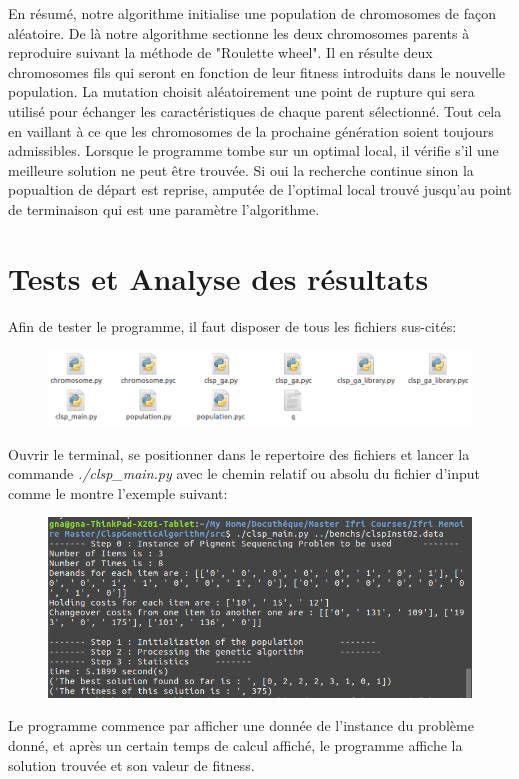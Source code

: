 \documentclass[11pt,a4paper]{article}
\begin{document}
	En résumé, notre algorithme initialise une population de chromosomes de façon aléatoire. De là notre algorithme sectionne les deux chromosomes parents à reproduire suivant la méthode de "Roulette wheel". Il en résulte deux chromosomes fils qui seront en fonction de leur fitness introduits dans le nouvelle population. La mutation choisit aléatoirement une point de rupture qui sera utilisé pour échanger les caractéristiques de chaque parent sélectionné. Tout cela en vaillant à ce que les chromosomes de la prochaine génération soient toujours admissibles. Lorsque le programme tombe sur un optimal local, il vérifie s'il une meilleure solution ne peut être trouvée. Si oui la recherche continue sinon la popualtion de départ est reprise, amputée de l'optimal local trouvé jusqu'au point de terminaison qui est une paramètre l'algorithme.  
	
\section{Tests et Analyse des résultats}
	Afin de tester le programme, il faut disposer de tous les fichiers sus-cités:
	\begin{center}
		\begin{figure}[h]
			\includegraphics[scale=.5]{img/files.png}
		\end{figure}
	\end{center}
	
	Ouvrir le terminal, se positionner dans le repertoire des fichiers et lancer la commande \emph{./clsp\_main.py} avec le chemin relatif ou absolu du fichier d'input comme le montre l'exemple suivant:
	
	\begin{center}
		\begin{figure}[h]
			\includegraphics[scale=.5]{img/test.png}
		\end{figure}
	\end{center}
	
	Le programme commence par afficher une donnée de l'instance du problème donné, et après un certain temps de calcul affiché, le programme affiche la solution trouvée et son valeur de fitness.
\end{document}
